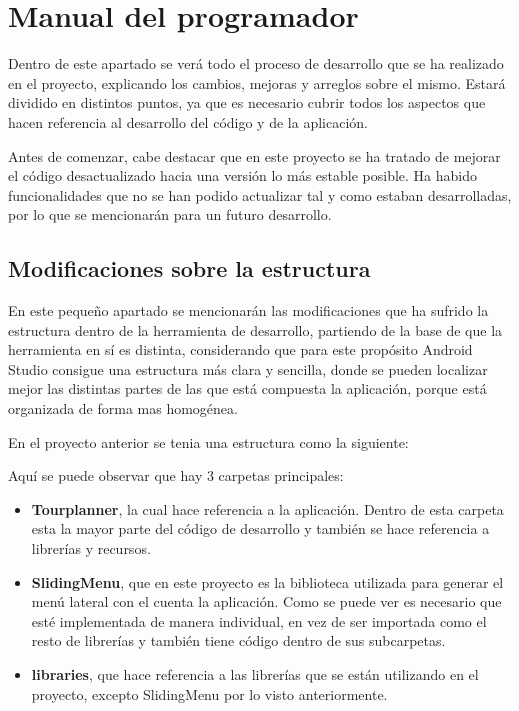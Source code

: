 \section{Manual del programador}

Dentro de este apartado se verá todo el proceso de desarrollo que se ha realizado en el proyecto, explicando los cambios, mejoras y arreglos sobre el mismo. Estará dividido en distintos puntos, ya que es necesario cubrir todos los aspectos que hacen referencia al desarrollo del código y de la aplicación.

Antes de comenzar, cabe destacar que en este proyecto se ha tratado de mejorar el código desactualizado hacia una versión lo más estable posible. Ha habido funcionalidades que no se han podido actualizar tal y como estaban desarrolladas, por lo que se mencionarán para un futuro desarrollo.

\subsection{Modificaciones sobre la estructura}

En este pequeño apartado se mencionarán las modificaciones que ha sufrido la estructura dentro de la herramienta de desarrollo, partiendo de la base de que la herramienta en sí es distinta, considerando que para este propósito Android Studio consigue una estructura más clara y sencilla, donde se pueden localizar mejor las distintas partes de las que está compuesta la aplicación, porque está organizada de forma mas homogénea.

En el proyecto anterior se tenia una estructura como la siguiente:


Aquí se puede observar que hay 3 carpetas principales:

\begin{itemize}
\item \textbf{Tourplanner}, la cual hace referencia a la aplicación. Dentro de esta carpeta esta la mayor parte del código de desarrollo y también se hace referencia a librerías y recursos.
\item \textbf{SlidingMenu}, que en este proyecto es la biblioteca utilizada para generar el menú lateral con el cuenta la aplicación. Como se puede ver es necesario que esté implementada de manera individual, en vez de ser importada como el resto de librerías y también tiene código dentro de sus subcarpetas.
\item \textbf{libraries}, que hace referencia a las librerías que se están utilizando en el proyecto, excepto SlidingMenu por lo visto anteriormente.
\end{itemize}

